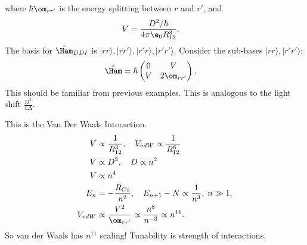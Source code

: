 \documentclass[a4paper, 11pt, normalem]{report}
\begin{document}
where $\hbar\om_{rr'}$ is the energy splitting between $r$ and $r'$, and
\begin{align}
    V &= \frac{D^2/\hbar}{4\pi\e_0 R_{12}^3}.
\end{align}
The basis for $\hat{\Ham}_{DDI}$ is $|rr\rangle,|rr'\rangle,|r'r\rangle,|r'r'\rangle$.
Consider the sub-bases $|rr\rangle,|r'r'\rangle$:
\begin{align}
    \hat{\Ham} &= \hbar\begin{pmatrix} 0 & V \\ V & 2\om_{rr'}\end{pmatrix}.
\end{align}
This should be familiar from previous examples.
This is analogous to the light shift $\frac{\Omega^2}{4\Delta}$.
\begin{figure}[H]
    \centering
\end{figure}
This is the Van Der Waals Interaction.
\begin{align}
    V &\propto \frac{1}{R_{12}^3},\quad V_{vdW} \propto \frac{1}{R_{12}^6} \\
    V &\propto D^2,\quad D\propto n^2 \\
    V &\propto n^4 \\
    E_n &= -\frac{R_{Cs}}{n^2},\quad E_{n+1} -N \propto \frac{1}{n^3},\; n\gg 1, \\
    V_{vdW} &\propto \frac{V^2}{\om_{rr'}} \propto \frac{n^8}{n^{-3}} \propto n^{11}.
\end{align}
So van der Waals has $n^{11}$ scaling!
Tunability is strength of interactions.
\end{document}
